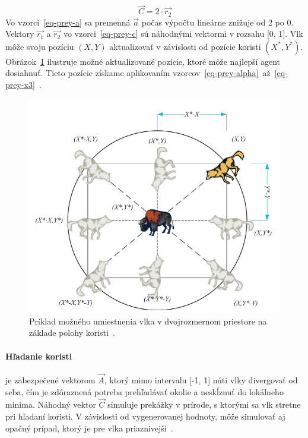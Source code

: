 \documentclass[a4paper,slovak,12pt,appendix]{article}
\begin{document}
\begin{equation}
  \vec{C} = 2 \cdot \vec{r_2}
  \label{eq-prey-c}
\end{equation}
Vo vzorci~\ref{eq-prey-a} sa premenná $\vec{a}$ počas výpočtu lineárne
znižuje od 2 po 0. Vektory $\vec{r_1}$ a $\vec{r_2}$ vo vzorci~\ref{eq-prey-c}
sú náhodnými vektormi v rozsahu [0, 1]. Vlk môže svoju pozíciu $(X, Y)$
aktualizovať v závislosti od pozície koristi $(X^*, Y^*)$.
Obrázok~\ref{fig-wolf-pos} ilustruje možné aktualizované pozície, ktoré môže
najlepší agent dosiahnuť. Tieto pozície získame aplikovaním
vzorcov~\ref{eq-prey-alpha}~až~\ref{eq-prey-x3}~\cite{Seeley1991}.

\begin{figure}[ht]
  \centering
  \includegraphics[width=\textwidth]{wolf_vector_positions.png}
  \caption{Príklad možného umiestnenia vlka v dvojrozmernom priestore na základe polohy koristi~\cite{Seeley1991}.}
  \label{fig-wolf-pos}
\end{figure}

\paragraph{Hľadanie koristi} je zabezpečené vektorom $\vec{A}$, ktorý mimo
intervalu [-1, 1] núti vlky divergovať od seba, čím je zdôraznená potreba
prehľadávať okolie a neskĺznuť do lokálneho minima. Náhodný vektor $\vec{C}$
simuluje prekážky v prírode, s ktorými sa vlk stretne pri hľadaní koristi.
V závislosti od vygenerovanej hodnoty, môže simulovať aj opačný prípad, ktorý
je pre vlka priaznivejší~\cite{Seeley1991}.
\end{document}
